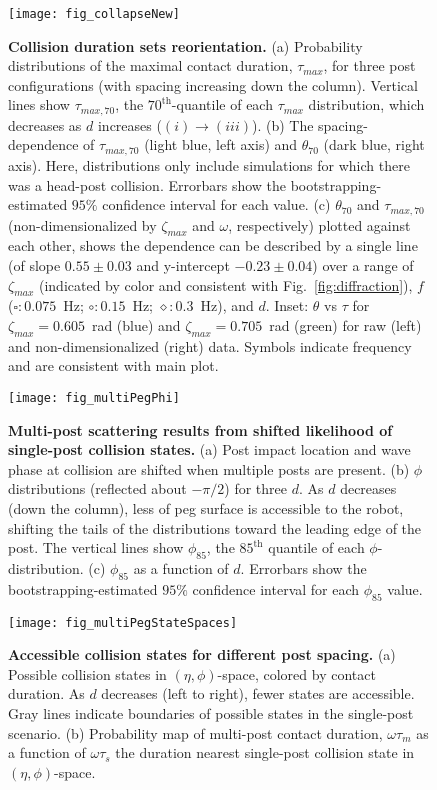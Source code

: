 \documentclass[aps,pre,twocolumn,superscriptaddress]{revtex4-1}
\begin{document}
\begin{figure}[h!]
	\texttt{[image: fig\_collapseNew]}
	\caption{\textbf{Collision duration sets reorientation.} (a) Probability distributions of the maximal contact duration, $\tau_{max}$, for three post configurations (with spacing increasing down the column). Vertical lines show $\tau_{max,70}$, the $70^{\mathrm{th}}$-quantile of each $\tau_{max}$ distribution, which decreases as $d$ increases ($(i) \to (iii)$). (b) The spacing-dependence of $\tau_{max,70}$ (light blue, left axis) and $\theta_{70}$ (dark blue, right axis). Here, distributions only include simulations for which there was a head-post collision. Errorbars show the bootstrapping-estimated $95\%$ confidence interval for each value. (c) $\theta_{70}$ and $\tau_{max,70}$ (non-dimensionalized by $\zeta_{max}$ and $\omega$, respectively) plotted against each other, shows the dependence can be described by a single line (of slope $0.55 \pm 0.03$ and y-intercept $-0.23 \pm 0.04$) over a range of $\zeta_{max}$ (indicated by color and consistent with Fig.~\ref{fig:diffraction}), $f$ ($\square: 0.075$~Hz; $\circ: 0.15$~Hz; $\diamond: 0.3$~Hz), and $d$. Inset: $\theta$ vs $\tau$ for $\zeta_{max} = 0.605$~rad (blue) and $\zeta_{max} = 0.705$~rad (green) for raw (left) and non-dimensionalized (right) data. Symbols indicate frequency and are consistent with main plot. 
	} 
	\label{fig:collapse}
\end{figure}

\begin{figure}[ht!]
	\texttt{[image: fig\_multiPegPhi]}
	\caption{\textbf{Multi-post scattering results from shifted likelihood of single-post collision states.} (a) Post impact location and wave phase at collision are shifted when multiple posts are present. (b) $\phi$ distributions (reflected about $-\pi/2$) for three $d$. As $d$ decreases (down the column), less of peg surface is accessible to the robot, shifting the tails of the distributions toward the leading edge of the post. The vertical lines show $\phi_{85}$, the $85^{\mathrm{th}}$ quantile of each $\phi$-distribution. (c) $\phi_{85}$ as a function of $d$. Errorbars show the bootstrapping-estimated $95\%$ confidence interval for each $\phi_{85}$ value. }
	\label{fig:phiShifts}
\end{figure}


\begin{figure}[ht!]
	\texttt{[image: fig\_multiPegStateSpaces]}
	\caption{\textbf{Accessible collision states for different post spacing.} (a) Possible collision states in $(\eta,\phi)$-space, colored by contact duration. As $d$ decreases (left to right), fewer states are accessible.  Gray lines indicate boundaries of possible states in the single-post scenario. (b) Probability map of multi-post contact duration, $\omega \tau_m$ as a function of $\omega \tau_s$ the duration nearest single-post collision state in $(\eta,\phi)$-space.}
	\label{fig:remapping}
\end{figure}
\end{document}
